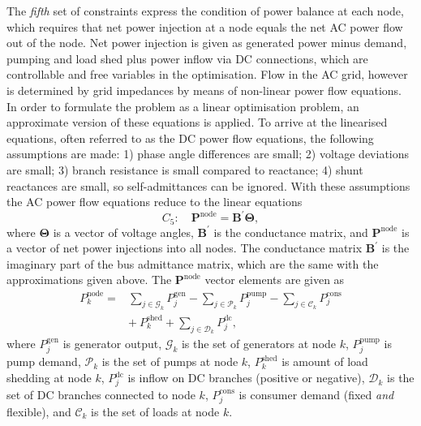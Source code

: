 \documentclass{article}
\begin{document}
The \emph{fifth} set of constraints express the condition of power balance at each node,
which requires that net power injection at a node equals the net AC power flow out of the node. 
%
Net power injection is given as generated power minus demand, pumping and load shed plus power inflow via DC connections, which are controllable and free variables in the optimisation.
%
Flow in the  AC grid, however is determined by grid impedances by means of non-linear power flow equations.  In order to formulate the problem as a linear optimisation problem, an approximate version of these equations is applied.
%
To arrive at the linearised equations, often referred to as the DC power flow equations, the following assumptions are made:
1) phase angle differences are small;
2) voltage deviations are small;
3) branch resistance is small compared to reactance;
4) shunt reactances are small, so self-admittances can be ignored.
%
With these assumptions the AC power flow equations reduce to the linear equations
\begin{equation}
	C_5: \quad
	\mathbf{P}^\text{node} = \mathbf{B}^\prime \mathbf{\Theta},
\end{equation}
where $\mathbf{\Theta}$ is a vector of voltage angles,
$\mathbf{B}^\prime$  is the conductance matrix,
and $\mathbf{P}^\text{node}$ is a vector of net power injections into all nodes.
%
The conductance matrix $\mathbf{B}^\prime$ is the imaginary part of the bus admittance matrix, which are the same with the approximations given above. 
%
The $\mathbf{P}^\text{node}$ vector elements are given as
\begin{equation}
\begin{split}
	P^\text{node}_k  = & \sum_{j\in\mathcal{G}_k} 
			P_j^\text{gen}
			- \sum_{j\in\mathcal{P}_k} P_j^\text{pump}
			- \sum_{j\in\mathcal{C}_k} P_j^\text{cons}
			\\ &
			+\ P_k^\text{shed}
			+\sum_{j\in\mathcal{D}_k} P_j^\text{dc}
			,
\end{split}
\end{equation}
where
$P_j^\text{gen}$ is generator output,
$\mathcal{G}_k$ is the set of generators at node $k$,
$P_j^\text{pump}$ is pump demand,
$\mathcal{P}_k$ is the set of pumps at node $k$,
$P_k^\text{shed}$ is amount of load shedding at node $k$,
$P_j^\text{dc}$ is inflow on DC branches (positive or negative),
$\mathcal{D}_k$ is the set of DC branches connected to node $k$,
$P_j^\text{cons}$ is consumer demand (fixed \emph{and} flexible),
and $\mathcal{C}_k$ is the set of loads at node $k$.
\end{document}
